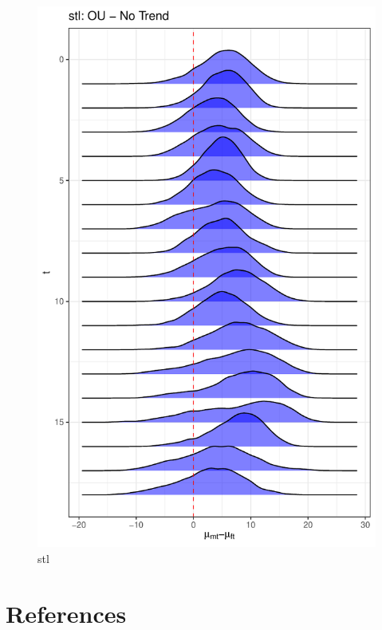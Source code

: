 \documentclass[
  12pt,
]{article}
\begin{document}
\begin{figure}

{\centering \includegraphics[width=0.9\linewidth]{../Figures/stl/mu_diff} 

}

\caption{stl}\label{fig:unnamed-chunk-20}
\end{figure}

\hypertarget{references}{%
\section{References}\label{references}}
\end{document}
